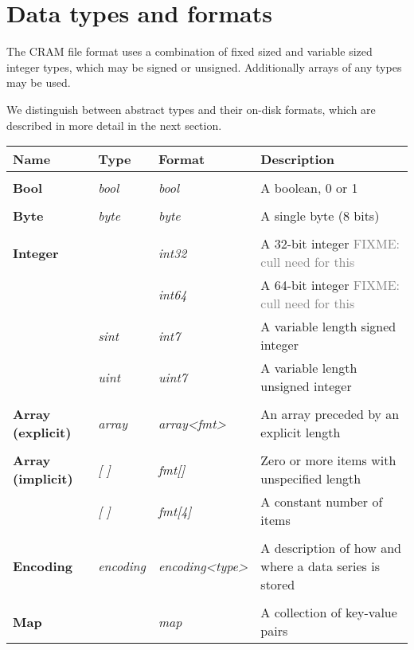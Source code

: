 \documentclass[a4paper]{article}
\begin{document}
\section{\textbf{Data types and formats}}

The CRAM file format uses a combination of fixed sized and variable
sized integer types, which may be signed or unsigned.  Additionally
arrays of any types may be used.

We distinguish between abstract types and their on-disk formats, which
are described in more detail in the next section.

\begin{tabular}{llll}
\textbf{Name}    & \textbf{Type}  & \textbf{Format}& \textbf{Description}\\
\hline
\\
\textbf{Bool}    & \textit{bool}  & \textit{bool}  & A boolean, 0 or 1 \\
\\
\textbf{Byte}    & \textit{byte}  & \textit{byte}  & A single byte (8 bits)  \\
\\
\textbf{Integer} & \textit{}      & \textit{int32} & A 32-bit integer \textcolor{gray}{FIXME: cull need for this}\\
                 & \textit{}      & \textit{int64} & A 64-bit integer \textcolor{gray}{FIXME: cull need for this}\\
                 & \textit{sint}  & \textit{int7}  & A variable length signed integer \\
                 & \textit{uint}  & \textit{uint7} & A variable length unsigned integer \\
\\
\textbf{Array (explicit)}
                 & \textit{array} & \textit{array<fmt>}  & An array preceded by an explicit length\\
\\
\textbf{Array (implicit)}
                 & \textit{[ ]} & \textit{fmt[]} & Zero or more items with unspecified length\\
                 & \textit{[ ]}   & \textit{fmt[4]} & A constant number of items\\
\\
\textbf{Encoding}& \textit{encoding} & \textit{encoding<type>} & A description of how and
                                             where a data series is stored\\
\\
\textbf{Map}     & \textit{}      & \textit{map}   & A collection of key-value pairs\\
\end{tabular}
\end{document}
